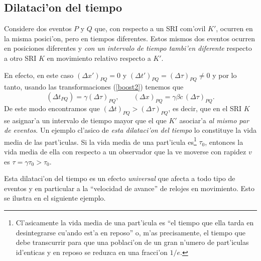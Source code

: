 \subsection{Dilataci'on del tiempo}
Considere dos eventos $P$ y $Q$ que, con respecto a un SRI com'ovil $K'$, ocurren en la misma posici'on, pero en tiempos diferentes. Estos mismos dos eventos ocurren en posiciones diferentes y \textit{con un intervalo de tiempo tambi'en diferente} respecto a otro SRI $K$ en movimiento relativo respecto a $K'$. 

En efecto, en este caso $(\Delta x')_{PQ}=0$ y $(\Delta t')_{PQ}=(\Delta\tau)_{PQ}\neq 0$ y por lo tanto, usando las transformaciones (\ref{boost2}) tenemos que
\begin{equation}
(\Delta t_{PQ})=\gamma (\Delta\tau)_{PQ}, \qquad (\Delta x)_{PQ}=\gamma\beta c\,(\Delta\tau)_{PQ}.
\end{equation}
De este modo encontramos que $(\Delta t)_{PQ}>(\Delta\tau)_{PQ}$, es decir, que en el SRI $K$ se asignar'a un intervalo de tiempo mayor que el que $K'$ asociar'a \textit{al mismo par de eventos}. Un ejemplo cl'asico de \textit{esta dilataci'on del tiempo} lo constituye la vida media de las part'iculas. Si la vida media de una part'icula es\footnote{Cl'asicamente la vida media de una part'icula es ``el tiempo que ella tarda en desintegrarse cu'ando est'a en reposo'' o, m'as precisamente, el tiempo que debe transcurrir para que una poblaci'on de un gran n'umero de part'iculas id'enticas y en reposo se reduzca en una fracci'on $1/e$.} $\tau_0$, entonces la vida media de ella con respecto a un observador que la ve moverse con rapidez $v$ es $\tau=\gamma\tau_0 >\tau_0$.

Esta dilataci'on del tiempo es un efecto \textit{universal} que afecta a todo tipo de eventos y en particular a la ``velocidad de avance'' de relojes en movimiento. Esto se ilustra en el siguiente ejemplo.

